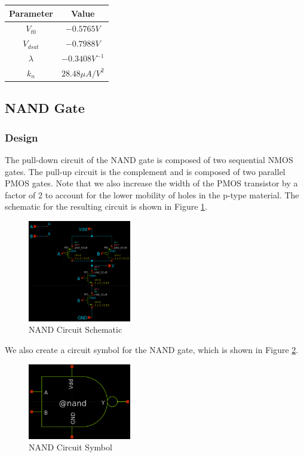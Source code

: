 \documentclass[fleqn]{article}
\begin{document}
	\begin{center}
	\begin{tabular}{| c | c |}
		\hline
		Parameter & Value \\
		\hline	
		$V_{t0}$ & $-0.5765 V$\\
		\hline	
		$V_{dsat}$ & $-0.7988 V$\\
		\hline	
		$\lambda$ & $-0.3408 V^{-1}$\\
		\hline			
		$k_n$ & $28.48 {\mu}A/V^2$ \\
		\hline
	\end{tabular}
	\end{center}
	
	\subsection{NAND Gate}
	
	\subsubsection{Design}
	
	The pull-down circuit of the NAND gate is composed of two sequential NMOS gates. The pull-up circuit is the complement and is composed of two parallel PMOS gates. Note that we also increase the width of the PMOS transistor by a factor of 2 to account for the lower mobility of holes in the p-type material. The schematic for the resulting circuit is shown in Figure \ref{fig::nand_schematic}.
	
	\begin{figure}[H]
		\centerline{\includegraphics[width=0.4\textwidth]{nand_schematic.png}}
		\caption{NAND Circuit Schematic}
		\label{fig::nand_schematic}
	\end{figure}

	We also create a circuit symbol for the NAND gate, which is shown in Figure \ref{fig::nand_symbol}.
	
	\begin{figure}[H]
		\centerline{\includegraphics[width=0.4\textwidth]{nand_symbol.png}}
		\caption{NAND Circuit Symbol}
		\label{fig::nand_symbol}
	\end{figure}
	
\end{document}
